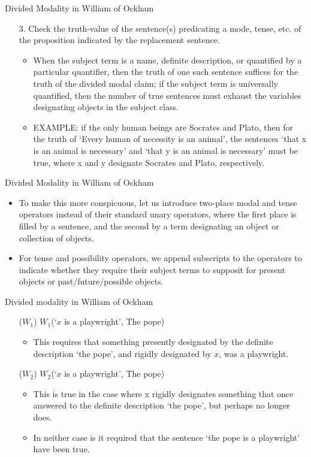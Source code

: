 \documentclass{beamer}
\begin{document}
\begin{frame}{Divided Modality in William of Ockham}
	\begin{itemize}
		\item[3.] Check the truth-value of the sentence(s) predicating a mode, tense, etc. of the proposition indicated by the replacement sentence. \pause 
			\begin{itemize}
				\item When the subject term is a name, definite description, or quantified by a particular quantifier, then the truth of one such sentence suffices for the truth of the divided modal claim; if the subject term is universally quantified, then the number of true sentences must exhaust the variables designating objects in the subject class. \pause
				\item EXAMPLE: if the only human beings are Socrates and Plato, then for the truth of `Every human of necessity is an animal', the sentences `that x is an animal is necessary' and `that y is an animal is necessary' must be true, where x and y designate Socrates and Plato, respectively.		
			\end{itemize}
		\end{itemize}
\end{frame}
\begin{frame}{Divided Modality in William of Ockham}
	\begin{itemize}
		\item To make this more conspicuous, let us introduce two-place modal and tense operators instead of their standard unary operators, where the first place is filled by a sentence, and the second by a term designating an object or collection of objects. \pause 
		\item For tense and possibility operators, we append subscripts to the operators to indicate whether they require their subject terms to supposit for present objects or past/future/possible objects.
\end{itemize}
\end{frame}
\begin{frame}{Divided modality in William of Ockham}
\begin{itemize}
	\item[($W_{1}$)] $W_{1}$(`$x$ is a playwright', The pope) \pause 
	\begin{itemize} 
	\item This requires that something presently designated by the definite description `the pope', and rigidly designated by $x$, was a playwright. \pause
	\end{itemize}
	\item[($W_{2}$)] $W_{2}$(`$x$ is a playwright', The pope) \pause 
	\begin{itemize}
		\item This is true in the case where x rigidly designates something that once answered to the definite description `the pope', but perhaps no longer does.  \pause 
		\item In neither case is it required that the sentence `the pope is a playwright' have been true.
	\end{itemize}
\end{itemize}
\end{frame}
\end{document}
